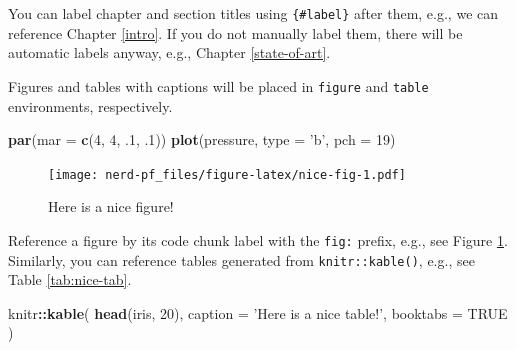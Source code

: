 \documentclass[12pt,a4paper,]{scrartcl}
\newenvironment{Shaded}{\begin{snugshade}}{\end{snugshade}}
\newcommand{\DataTypeTok}[1]{\textcolor[rgb]{0.13,0.29,0.53}{#1}}
\newcommand{\DecValTok}[1]{\textcolor[rgb]{0.00,0.00,0.81}{#1}}
\newcommand{\FloatTok}[1]{\textcolor[rgb]{0.00,0.00,0.81}{#1}}
\newcommand{\KeywordTok}[1]{\textcolor[rgb]{0.13,0.29,0.53}{\textbf{#1}}}
\newcommand{\NormalTok}[1]{#1}
\newcommand{\OperatorTok}[1]{\textcolor[rgb]{0.81,0.36,0.00}{\textbf{#1}}}
\newcommand{\OtherTok}[1]{\textcolor[rgb]{0.56,0.35,0.01}{#1}}
\newcommand{\StringTok}[1]{\textcolor[rgb]{0.31,0.60,0.02}{#1}}
\begin{document}
You can label chapter and section titles using \texttt{\{\#label\}} after them, e.g., we can reference Chapter \ref{intro}. If you do not manually label them, there will be automatic labels anyway, e.g., Chapter \ref{state-of-art}.

Figures and tables with captions will be placed in \texttt{figure} and \texttt{table} environments, respectively.

\begin{Shaded}
\begin{Highlighting}[]
\KeywordTok{par}\NormalTok{(}\DataTypeTok{mar =} \KeywordTok{c}\NormalTok{(}\DecValTok{4}\NormalTok{, }\DecValTok{4}\NormalTok{, }\FloatTok{.1}\NormalTok{, }\FloatTok{.1}\NormalTok{))}
\KeywordTok{plot}\NormalTok{(pressure, }\DataTypeTok{type =} \StringTok{'b'}\NormalTok{, }\DataTypeTok{pch =} \DecValTok{19}\NormalTok{)}
\end{Highlighting}
\end{Shaded}

\begin{figure}

{\centering \texttt{[image: nerd-pf\_files/figure-latex/nice-fig-1.pdf]} 

}

\caption{Here is a nice figure!}\label{fig:nice-fig}
\end{figure}

Reference a figure by its code chunk label with the \texttt{fig:} prefix, e.g., see Figure \ref{fig:nice-fig}. Similarly, you can reference tables generated from \texttt{knitr::kable()}, e.g., see Table \ref{tab:nice-tab}.

\begin{Shaded}
\begin{Highlighting}[]
\NormalTok{knitr}\OperatorTok{::}\KeywordTok{kable}\NormalTok{(}
  \KeywordTok{head}\NormalTok{(iris, }\DecValTok{20}\NormalTok{), }\DataTypeTok{caption =} \StringTok{'Here is a nice table!'}\NormalTok{,}
  \DataTypeTok{booktabs =} \OtherTok{TRUE}
\NormalTok{)}
\end{Highlighting}
\end{Shaded}
\end{document}
